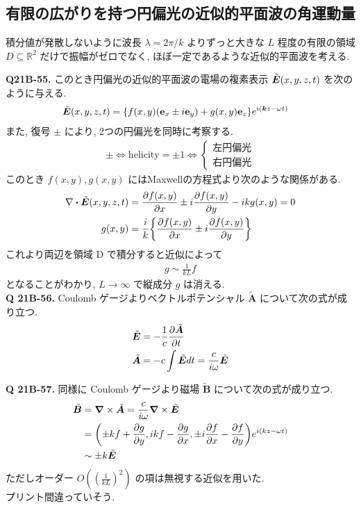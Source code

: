 \documentclass[uplatex,dvipdfmx,a4paper,11pt]{jlreq}
\newcommand{\RR}{\mathbb{R}}
\newcommand{\BB}{\bm{B}}
\renewcommand{\AA}{\bm{A}}
\newcommand{\kk}{\bm{k}}
\theoremstyle{definition}
\begin{document}
\subsection{有限の広がりを持つ円偏光の近似的平面波の角運動量}
積分値が発散しないように波長 $\lambda=2\pi/k$ よりずっと大きな $L$ 程度の有限の領域 $D\subseteq\RR^2$ だけで振幅がゼロでなく, ほぼ一定であるような近似的平面波を考える. \\
\begin{proposition}[円筒対称性]
\end{proposition}

\textbf{Q21B-55.}
このとき円偏光の近似的平面波の電場の複素表示 $\tilde{\bm{E}}(x,y,z,t)$ を次のように与える.
\begin{align}
  \ET(x,y,z,t) & = \qty{f(x,y)(\vb{e}_x\pm i\vb{e}_y) + g(x,y)\vb{e}_z}e^{i(\kk z-\omega t)} \label{def ET D}
\end{align}
また, 復号 $\pm$ により, 2つの円偏光を同時に考察する.
\begin{align}
  \pm\iff \mathrm{helicity} = \pm 1 \iff \begin{cases}
                                           左円偏光 \\
                                           右円偏光
                                         \end{cases}
\end{align}
このとき $f(x,y), g(x,y)$ にはMaxwellの方程式より次のような関係がある.
\begin{align}
  \nabla\vdot\ET(x,y,z,t) & = \pdv{f(x,y)}{x}\pm i\pdv{f(x,y)}{y} - i kg(x,y) = 0  \\
  g(x,y)                  & = \frac{i}{k}\qty{\pdv{f(x,y)}{x}\pm i\pdv{f(x,y)}{y}}
\end{align}
これより両辺を領域 D で積分すると近似によって
\begin{align}
  g\sim\frac{1}{kL}f
\end{align}
となることがわかり, $L\to\infty$ で縦成分 $g$ は消える. \\

\textbf{Q 21B-56.}
Coulomb ゲージよりベクトルポテンシャル $\tilde{\AA}$ について次の式が成り立つ.
\begin{align}
  \ET         & = -\frac{1}{c}\pdv{\tilde{\AA}}{t}    \\
  \tilde{\AA} & = -c\int\ET dt = \frac{c}{i\omega}\ET
\end{align}

\textbf{Q 21B-57.}
同様に Coulomb ゲージより磁場 $\tilde{\BB}$ について次の式が成り立つ.
\begin{align}
  \tilde{\BB} & = \vnabla\times\tilde{\AA} = \frac{c}{i\omega}\vnabla\times\ET                               \\
              & = \qty(\pm kf + \pdv{g}{y}, ikf -\pdv{g}{x}, \pm i\pdv{f}{x} - \pdv{f}{y})e^{i(kz-\omega t)} \\
              & \sim \pm k\ET
\end{align}
ただしオーダー $O((\frac{1}{kL})^2)$ の項は無視する近似を用いた. \\
プリント間違っていそう. \\
\end{document}
